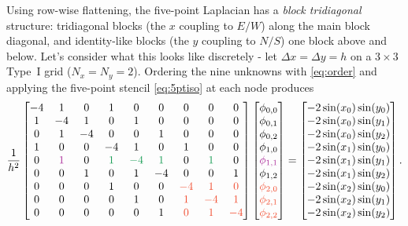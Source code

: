 Using row-wise flattening, the five-point Laplacian has a \emph{block
tridiagonal} structure: tridiagonal blocks (the $x$ coupling to $E/W$) along the main
block diagonal, and identity-like blocks (the $y$ coupling to $N/S$) one block above
and below. Let's consider what this looks like discretely - let $\Delta x = \Delta y = h$ on a $3\times3$ Type~I grid ($N_x=N_y=2$). Ordering the
nine unknowns with \eqref{eq:order} and applying the five-point stencil
\eqref{eq:5ptiso} at each node produces
\begin{equation}
    \frac{1}{h^2}
    \begin{bmatrix}
        -4 &  1 &  0 &  1 &  0 &  0 &  0 &  0 &  0 \\
         1 & -4 &  1 &  0 &  1 &  0 &  0 &  0 &  0 \\
         0 &  1 & -4 &  0 &  0 &  1 &  0 &  0 &  0 \\
         1 &  0 &  0 & -4 &  1 &  0 &  1 &  0 &  0 \\
         0 &  \textcolor{Mulberry}{1} &  0 &  \textcolor{ForestGreen}{1} & \textcolor{ForestGreen}{-4} &  \textcolor{ForestGreen}{1} &  0 &  \textcolor{ForestGreen}{1} &  0 \\
         0 &  0 &  1 &  0 &  1 & -4 &  0 &  0 &  1 \\
         0 &  0 &  0 &  1 &  0 &  0 & \textcolor{RedOrange}{-4} &  \textcolor{RedOrange}{1} & \textcolor{RedOrange}{0} \\
         0 &  0 &  0 &  0 &  1 &  0 &  \textcolor{RedOrange}{1} & \textcolor{RedOrange}{-4} &  \textcolor{RedOrange}{1} \\
         0 &  0 &  0 &  0 &  0 &  1 &  \textcolor{RedOrange}{0} &  \textcolor{RedOrange}{1} & \textcolor{RedOrange}{-4}
    \end{bmatrix}
    \begin{bmatrix}
        \phi_{0,0} \\ \phi_{0,1} \\ \phi_{0,2} \\
        \phi_{1,0} \\ \textcolor{Mulberry}{\phi_{1,1}} \\ \phi_{1,2}\\
        \textcolor{RedOrange}{\phi_{2,0}} \\ \textcolor{RedOrange}{\phi_{2,1}} \\ \textcolor{RedOrange}{\phi_{2,2}}
    \end{bmatrix}
    =
    \begin{bmatrix}
        -2\sin(x_0)\sin(y_0) \\
        -2\sin(x_0)\sin(y_1)\\
        -2\sin(x_0)\sin(y_2) \\
        -2\sin(x_1)\sin(y_0)\\
        -2\sin(x_1)\sin(y_1) \\
        -2\sin(x_1)\sin(y_2) \\
        -2\sin(x_2)\sin(y_0) \\
        -2\sin(x_2)\sin(y_1) \\
        -2\sin(x_2)\sin(y_2)
    \end{bmatrix}.
    \label{eq:2Dexpanded}
\end{equation}
